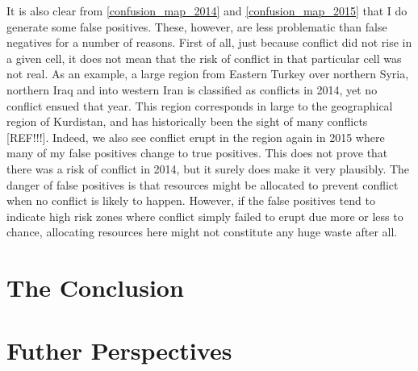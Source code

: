 \documentclass[a4paper]{article}
\begin{document}
It is also clear from \autoref{confusion_map_2014} and \autoref{confusion_map_2015} that I do generate some false positives. These, however, are less problematic than false negatives for a number of reasons. First of all, just because conflict did not rise in a given cell, it does not mean that the risk of conflict in that particular cell was not real. As an example, a large region from Eastern Turkey over northern Syria, northern Iraq and into western Iran is classified as conflicts in 2014, yet no conflict ensued that year. This region corresponds in large to the geographical region of Kurdistan, and has historically been the sight of many conflicts [REF!!!].  Indeed, we also see conflict erupt in the region again in 2015 where many of my false positives change to true positives. This does not prove that there was a risk of conflict in 2014, but it surely does make it very plausibly. The danger of false positives is that resources might be allocated to prevent conflict when no conflict is likely to happen. However, if the false positives tend to indicate high risk zones where conflict simply failed to erupt due more or less to chance, allocating resources here might not constitute any huge waste after all.\par







\section{The Conclusion}

\section{Futher Perspectives}

\end{document}
